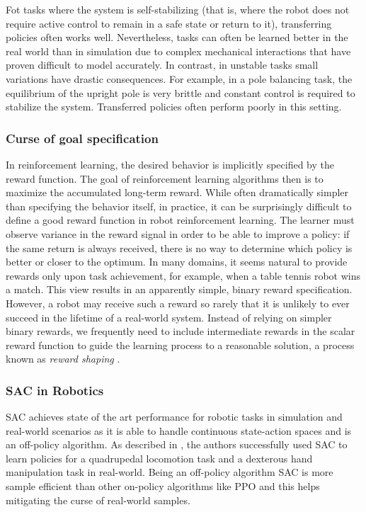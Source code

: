 Fot tasks where the system is self-stabilizing (that is, where the robot does not require active control to remain in a safe state or return to it),
transferring policies often works well. Nevertheless, tasks can often be learned better in the real world than in simulation due to complex mechanical interactions
that have proven difficult to model accurately. In contrast, in unstable tasks small variations have drastic consequences. For example, in a pole balancing
task, the equilibrium of the upright pole is very brittle and constant control is required to stabilize the system. Transferred policies often perform poorly
in this setting.

\subsubsection{Curse of goal specification}
In reinforcement learning, the desired behavior is implicitly specified by the reward function. The goal of reinforcement
learning algorithms then is to maximize the accumulated long-term reward. While often dramatically simpler than
specifying the behavior itself, in practice, it can be surprisingly difficult to define a good reward function in robot
reinforcement learning. The learner must observe variance in the reward signal in order to be able to improve a
policy: if the same return is always received, there is no way to determine which policy is better or closer to the
optimum. In many domains, it seems natural to provide rewards only upon task achievement, for example, when a table tennis
robot wins a match. This view results in an apparently simple, binary reward specification. However, a robot may
receive such a reward so rarely that it is unlikely to ever succeed in the lifetime of a real-world system. Instead of
relying on simpler binary rewards, we frequently need to include intermediate rewards in the scalar reward function
to guide the learning process to a reasonable solution, a process known as \textit{reward shaping} \cite{Laud2004}.

\subsubsection{SAC in Robotics}
SAC \cite{SAC} achieves state of the art performance for robotic tasks in simulation and real-world scenarios as it is able to
handle continuous state-action spaces and is an off-policy algorithm.
As described in \cite{SAC_modified}, the authors successfully used SAC to learn policies for a quadrupedal locomotion task and
a dexterous hand manipulation task in real-world. Being an off-policy algorithm SAC is more sample efficient than other on-policy
algorithms like PPO \cite{PPO} and this helps mitigating the curse of real-world samples.

